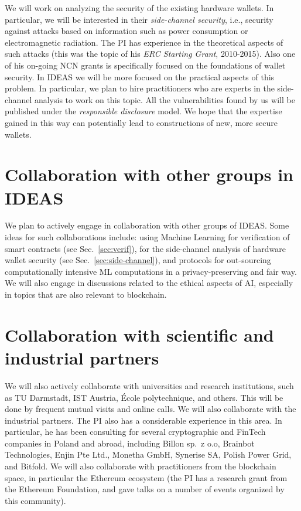 \documentclass{article}
\begin{document}
We will work on analyzing the security of the existing hardware wallets. In particular, we will be interested in their \emph{side-channel security}, i.e., security against attacks based on information such as power consumption or electromagnetic radiation. The PI has experience in the theoretical aspects of such attacks (this was the topic of his \emph{ERC Starting Grant}, 2010-2015). Also one of his on-going NCN grants is specifically focused on the foundations of wallet security. In IDEAS we will be more focused on the practical aspects of this problem. In particular, we plan to hire practitioners who are experts in the side-channel analysis to work on this topic. All the vulnerabilities found by us will be published under the \emph{responsible disclosure} model. We hope that the expertise gained in this way can potentially lead to constructions of new, more secure wallets. 

\section{Collaboration with other groups in IDEAS}

We plan to actively engage in collaboration with other groups of IDEAS. Some ideas for such collaborations include: using Machine Learning for verification of smart contracts (see Sec.~\ref{sec:verif}), for the side-channel analysis of hardware wallet security (see Sec.~\ref{sec:side-channel}), and protocols for out-sourcing computationally intensive ML computations in a privacy-preserving and fair way. We will also engage in discussions related to the ethical aspects of AI, especially in topics that are also relevant to blockchain.



\section{Collaboration with scientific and industrial partners}

We will also actively collaborate with universities and research institutions, such as TU Darmstadt, IST Austria, \'Ecole polytechnique, and others. This will be done by frequent mutual visits and online calls. We will also collaborate with the industrial partners. The PI also has a considerable experience in this area. In particular, he has been consulting for several cryptographic and FinTech companies in Poland and abroad, including  Billon sp.~z o.o, Brainbot Technologies, Enjin Pte Ltd., Monetha GmbH, Synerise SA, Polish Power Grid, and  Bitfold. We will also collaborate with practitioners from the blockchain space, in particular the Ethereum ecosystem (the PI has a research grant from the Ethereum Foundation, and gave talks on a number of events organized by this community). 
\end{document}
